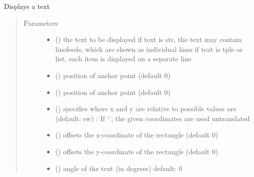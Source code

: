 \documentclass[letterpaper,10pt,english]{sphinxmanual}
\begin{document}
\begin{fulllineitems}
\label{\detokenize{Reference:salabim.AnimateText}}
Displays a text
\begin{quote}\begin{description}
\item[{Parameters}] \leavevmode\begin{itemize}
\item {} 
 (\sphinxstyleliteralemphasis{, }) \textendash{} the text to be displayed 
if text is str, the text may contain linefeeds, which are shown as individual lines
if text is tple or list, each item is displayed on a separate line

\item {} 
 () \textendash{} position of anchor point (default 0)

\item {} 
 () \textendash{} position of anchor point (default 0)

\item {} 
 () \textendash{} specifies where x and y are relative to 
possible values are (default: sw) : 
If ‘’, the given coordimates are used untranslated

\item {} 
 () \textendash{} offsets the x-coordinate of the rectangle (default 0)

\item {} 
 () \textendash{} offsets the y-coordinate of the rectangle (default 0)

\item {} 
 () \textendash{} angle of the text (in degrees) 
default: 0


\end{itemize}
\end{description}
\end{quote}
\end{fulllineitems}
\end{document}
